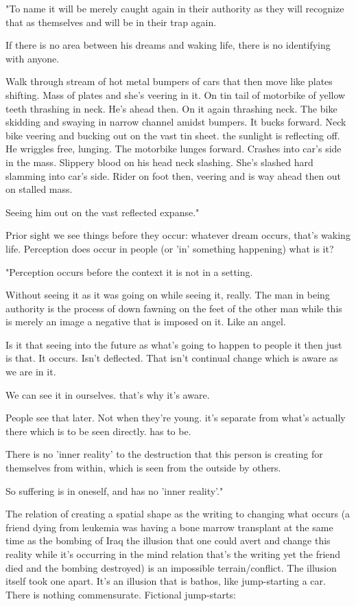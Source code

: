 "To name it will be merely caught again in their authority as they will
recognize that as themselves and will be in their trap again.

If there is no area between his dreams and waking life, there is no
identifying with anyone.

Walk through stream of hot metal bumpers of cars that then move like
plates shifting. Mass of plates and she's veering in it. On tin tail of
motorbike of yellow teeth thrashing in neck. He's ahead then. On it
again thrashing neck. The bike skidding and swaying in narrow channel
amidst bumpers. It bucks forward. Neck bike veering and bucking out on
the vast tin sheet. the sunlight is reflecting off. He wriggles free,
lunging. The motorbike lunges forward. Crashes into car's side in the
mass. Slippery blood on his head neck slashing. She's slashed hard
slamming into car's side. Rider on foot then, veering and is way ahead
then out on stalled mass.

Seeing him out on the vast reflected expanse."

Prior sight we see things before they occur: whatever dream occurs,
that's waking life. Perception does occur in people (or 'in' something
happening) what is it?

"Perception occurs before the context it is not in a setting.

Without seeing it as it was going on while seeing it, really. The man in
being authority is the process of down fawning on the feet of the other
man while this is merely an image a negative that is imposed on it. Like
an angel.

Is it that seeing into the future as what's going to happen to people it
then just is that. It occurs. Isn't deflected. That isn't continual
change which is aware as we are in it.

We can see it in ourselves. that's why it's aware.

People see that later. Not when they're young. it's separate from what's
actually there which is to be seen directly. has to be.

There is no 'inner reality' to the destruction that this person is
creating for themselves from within, which is seen from the outside by
others.

So suffering is in oneself, and has no 'inner reality'."

The relation of creating a spatial shape as the writing to changing what
occurs (a friend dying from leukemia was having a bone marrow transplant
at the same time as the bombing of Iraq the illusion that one could
avert and change this reality while it's occurring in the mind relation
that's the writing yet the friend died and the bombing destroyed) is an
impossible terrain/conflict. The illusion itself took one apart. It's an
illusion that is bathos, like jump-starting a car. There is nothing
commensurate. Fictional jump-starts:

